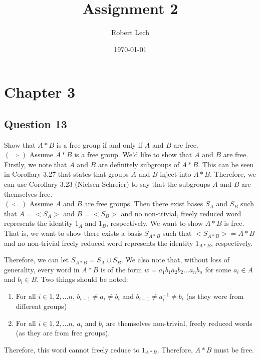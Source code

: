 \documentclass[12pt]{article}%
\begin{document}
\title{Assignment 2}
\author{Robert Lech}
\date{\today}
\maketitle
\section*{Chapter 3}

\subsection*{Question 13}

Show that $A*B$ is a free group if and only if $A$ and $B$ are free.\\

$(\Rightarrow)$ Assume $A*B$ is a free group. We'd like to show that $A$ and $B$ are free. Firstly, we note that $A$ and $B$ are definitely subgroups of $A*B$. This can be seen in Corollary 3.27 that states that groups $A$ and $B$ inject into $A*B$. Therefore, we can use Corollary 3.23 (Nielsen-Schreier) to say that the subgroups $A$ and $B$ are themselves free.\\

$(\Leftarrow)$ Assume $A$ and $B$ are free groups. Then there exist bases $S_A$ and $S_B$ such that $A=<S_A>$ and $B=<S_B>$ and no non-trivial, freely reduced word represents the identity $1_A$ and $1_B$, respectively. We want to show $A*B$ is free. That is, we want to show there exists a basis $S_{A*B}$ such that $<S_{A*B}>=A*B$ and no non-trivial freely reduced word represents the identity $1_{A*B}$, respectively.

Therefore, we can let $S_{A*B}=S_A \cup S_B$. We also note that, without loss of generality, every word in $A*B$ is of the form $w=a_{1}b_{1}a_{2}b_{2}\ldots a_{n}b_{n}$ for some $a_i\in A$ and $b_i\in B$. Two things should be noted: 

\begin{enumerate}
\item For all $i\in {1, 2, \ldots n}$, $b_{i-1} \neq a_i \neq b_i$ and $b_{i-1} \neq a_i^{-1} \neq b_i$ (as they were from different groups)
\item For all $i\in {1, 2, \ldots n}$, $a_i$ and $b_i$ are themselves non-trivial, freely reduced words (as they are from free groups).
\end{enumerate}

Therefore, this word cannot freely reduce to $1_{A*B}$. Therefore, $A*B$ must be free.
\end{document}

